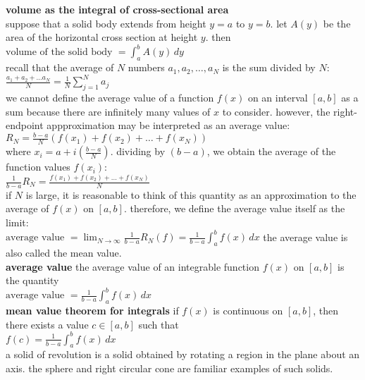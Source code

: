 \documentclass{article}
\begin{document}
\textbf{volume as the integral of cross-sectional area}\\
suppose that a solid body extends from height $y = a$ to $y = b$. let $A(y)$ be the area of the horizontal cross section at height $y$. then\\ $\text{volume of the solid body } = \int_{a}^{b}A(y)\,dy$\\

recall that the average of $N$ numbers $a_1, a_2, \ldots, a_N$ is the sum divided by $N$:\\ $\frac{a_1 + a_2 + \ldots a_N}{N} = \frac{1}{N}\sum_{j=1}^{N}a_j$\\ 

we cannot define the average value of a function $f(x)$ on an interval $[a, b]$ as a sum because there are infinitely many values of $x$ to consider. however, the right-endpoint appproximation may be interpreted as an average value:\\
$R_N = \frac{b - a}{N}(f(x_1) + f(x_2) + \ldots + f(x_N))$\\
where $x_i = a + i(\frac{b - a}{N})$. dividing by $(b - a)$, we obtain the average of the function values $f(x_i)$:\\
$\frac{1}{b - a}R_N = \frac{f(x_1) + f(x_2) + \ldots + f(x_N)}{N}$\\
if $N$ is large, it is reasonable to think of this quantity as an approximation to the average of $f(x)$ on $[a, b]$. therefore, we define the average value itself as the limit:\\

$\text{average value } = \lim_{N \to \infty}\frac{1}{b - a}R_N(f) = \frac{1}{b - a}\int_{a}^{b}f(x)\,dx$ the average value is also called the mean value.\\

\textbf{average value} the average value of an integrable function $f(x)$ on $[a, b]$ is the quantity\\ $\text{average value } = \frac{1}{b - a}\int_{a}^{b}f(x)\,dx$\\

\textbf{mean value theorem for integrals} if $f(x)$ is continuous on $[a, b]$, then there exists a value $c \in [a, b]$ such that\\ $f(c) = \frac{1}{b - a}\int_{a}^{b}f(x)\,dx$\\

a solid of revolution is a solid obtained by rotating a region in the plane about an axis. the sphere and right circular cone are familiar examples of such solids.\\
\end{document}
